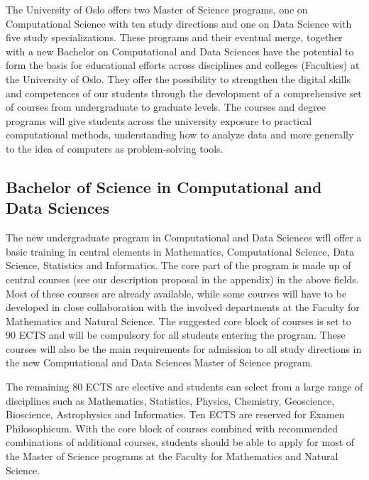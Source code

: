 \documentclass[oneside,final,10pt]{article}
\begin{document}
The University of Oslo offers two Master of Science programs, one on Computational Science with ten study directions and one on Data Science with five study specializations.
These programs and their eventual merge, together with a new Bachelor on Computational and Data Sciences have the potential to  form the basis for  educational efforts  across disciplines and colleges (Faculties) at the University of Oslo. They offer the possibility to  strengthen  the digital skills and competences of our students through the development of a comprehensive set of courses from undergraduate to graduate levels. The courses and degree programs will give students across the university exposure to practical computational methods, understanding how to analyze data and more generally to the idea of computers as problem-solving tools.  
 

\subsection*{Bachelor of Science in Computational and Data Sciences}

The new undergraduate program in Computational and Data Sciences will offer a basic training in central elements in Mathematics, Computational Science, Data Science, Statistics and Informatics. 
The core part of the program is made up of central courses (see our description proposal in the appendix) in the above fields. Most of these courses are already available, while some courses will have to be developed in close collaboration with the involved departments at the Faculty for Mathematics and Natural Science.
The suggested core block of courses is set to 90 ECTS and will be compulsory for all students entering the program. These courses will also be the main requirements for admission to
 all study directions in the new Computational and Data Sciences Master of Science program.


The remaining 80 ECTS are elective and students can select from a large range of disciplines such as Mathematics, Statistics, Physics, Chemistry, Geoscience, Bioscience, Astrophysics and Informatics.  Ten ECTS are reserved for Examen Philosophicum.
With the core block of courses combined with recommended combinations of additional courses,  students should be able to apply for most of the Master of Science programs at the Faculty for Mathematics and Natural Science. 
\end{document}
